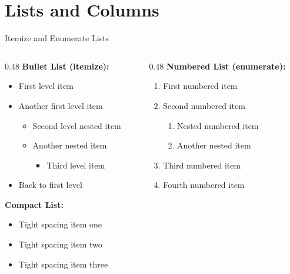 \section{Lists and Columns}

\begin{frame}{Itemize and Enumerate Lists}
  \begin{columns}[T]
    \begin{column}{0.48\textwidth}
      \textbf{Bullet List (itemize):}
      \scriptsize
      \begin{itemize}
        \setlength{\itemsep}{3pt}
        \item First level item
        \item Another first level item
          \begin{itemize}
            \item Second level nested item
            \item Another nested item
              \begin{itemize}
                \item Third level item
              \end{itemize}
          \end{itemize}
        \item Back to first level
      \end{itemize}

      \vspace{0.2cm}

      \textbf{Compact List:}
      \begin{itemize}
        \setlength{\itemsep}{0pt}
        \item Tight spacing item one
        \item Tight spacing item two
        \item Tight spacing item three
      \end{itemize}
    \end{column}
    \begin{column}{0.48\textwidth}
      \textbf{Numbered List (enumerate):}
      \scriptsize
      \begin{enumerate}
        \setlength{\itemsep}{3pt}
        \item First numbered item
        \item Second numbered item
          \begin{enumerate}
            \item Nested numbered item
            \item Another nested item
          \end{enumerate}
        \item Third numbered item
        \item Fourth numbered item
      \end{enumerate}


\end{column}
\end{columns}
\end{frame}

